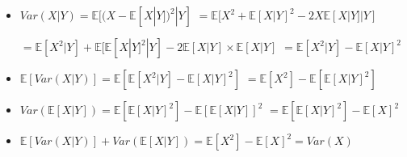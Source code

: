 \documentclass[a4paper]{article}
\begin{document}
\section{}
\begin{itemize}
\begin{figure} [H]
    \texttt{[image: question/6.png]}
\end{figure}
    \item $\mathit{Var}(X|Y) = \mathbb{E}[(X-\mathbb{E}[X|Y])^2|Y]$
        $= \mathbb{E}[X^2 + \mathbb{E}[X|Y]^2 - 2X\mathbb{E}[X|Y]|Y]$

        $= \mathbb{E}[X^2|Y] + \mathbb{E}[\mathbb{E}[X|Y]^2|Y] - 2 \mathbb{E}[X|Y] \times \mathbb{E}[X|Y]$
        $= \mathbb{E}[X^2|Y] - \mathbb{E}[X|Y]^2$
    \item $\mathbb{E}[\mathit{Var}(X|Y)] = \mathbb{E}[\mathbb{E}[X^2|Y] - \mathbb{E}[X|Y]^2]$
        $= \mathbb{E}[X^2] - \mathbb{E}[\mathbb{E}[X|Y]^2]$
    \item $\mathit{Var}(\mathbb{E}[X|Y]) = \mathbb{E}[\mathbb{E}[X|Y]^2] - \mathbb{E}[\mathbb{E}[X|Y]]^2$
        $= \mathbb{E}[\mathbb{E}[X|Y]^2] - \mathbb{E}[X]^2$
    \item $\mathbb{E}[\mathit{Var}(X|Y)] + \mathit{Var}(\mathbb{E}[X|Y]) = \mathbb{E}[X^2] - \mathbb{E}[X]^2 = \mathit{Var}(X)$
\end{itemize}
\end{document}
